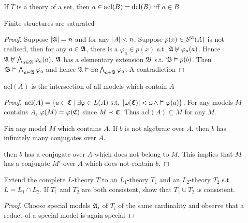 \documentclass[11pt]{article}
\def \acl {\text{acl}}
\begin{document}
\begin{examplle}[]
If \(T\) is a theory of a set, then \(a\in\acl(B)=\dcl(B)\) iff \(a\in B\)
\end{examplle}

\begin{exercise}
\label{6.1.1}
Finite structures are saturated
\end{exercise}

\begin{proof}
Suppose \(\abs{\fA}=n\) and for any \(\abs{A}<n\). Suppose \(p(x)\in S^{\mathfrak{A}}(A)\) is not realised,
then for any \(a\in\mathfrak{A}\), there is a \(\varphi_a\in p(x)\) s.t. \(\mathfrak{A}\not\vDash\varphi_a(a)\).
Hence \(\mathfrak{A}\not\vDash\bigwedge_{a\in\mathfrak{A}}\varphi_a(a)\). \(\mathfrak{A}\) has a elementary extension \(\mathfrak{B}\) s.t. \(\mathfrak{B}\vDash p(b)\). Then
\(\mathfrak{B}\vDash\bigwedge_{a\in\mathfrak{A}}\varphi_a\) and hence \(\mathfrak{A}\vDash\exists a\bigwedge_{a\in\mathfrak{A}}\varphi_a\). A contradiction
\end{proof}

\begin{exercise}
\label{6.1.2}
\(\acl(A)\) is the intersection of all models which contain \(A\)
\end{exercise}

\begin{proof}
\(\acl(A)=\{a\in\fC\mid\exists\varphi\in L(A)\text{ s.t. }\abs{\varphi(\fC)}<\omega\wedge\vDash\varphi(a)\}\). For any models \(M\)
contains \(A\), \(\varphi(M)=\varphi(\mathfrak{C})\) since \(M\prec\mathfrak{C}\). Thus \(\acl(A)\subseteq M\) for any \(M\).

Fix any model \(M\) which contains \(A\). If \(b\) is not algebraic over \(A\), then \(b\) has
infinitely many conjugates over \(A\).

then \(b\) has a
conjugate over \(A\) which does not belong to \(M\). This implies that \(M\) has a
conjugate \(M'\) over \(A\) which does not contain \(b\).
\end{proof}

\begin{exercise}
\label{ex6.1.3}
Extend the complete \(L\)-theory \(T\) to an \(L_1\)-theory \(T_1\) and
an \(L_2\)-theory \(T_2\) s.t. \(L=L_1\cap L_2\). If \(T_1\) and \(T_2\) are both consistent, show
that \(T_1\cup T_2\) is consistent.
\end{exercise}

\begin{proof}
Choose special models \(\mathfrak{A}_i\) of \(T_i\) of the same cardinality and observe that a reduct of a
special model is again special
\end{proof}
\end{document}
